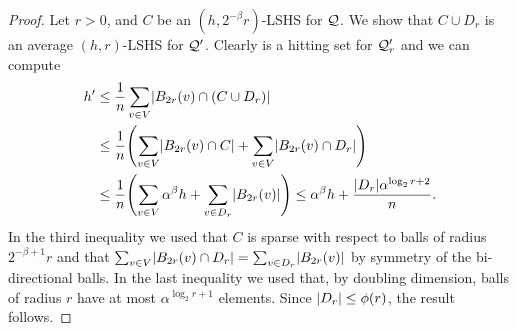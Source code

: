 \begin{proof}
Let $r>0$, and $C$ be an $(h,2^{-\beta}r)$-LSHS for $\mathcal{Q}$.
We show that $C\cup D_r$ is an average $(h,r)$-LSHS for $\mathcal{Q}'$.
Clearly is a hitting set for $\mathcal{Q}'_r$ and we can compute
\begin{align*}
h'&\leq \frac{1}{n}\sum_{v\in V} \abs{B_{2r}(v)\cap (C\cup D_r)}\\
&\leq \frac{1}{n}\prn*{\sum_{v\in V} \abs{B_{2r}(v)\cap C}+\sum_{v\in V} \abs{B_{2r}(v)\cap D_r}}\\
&\leq \frac{1}{n}\prn*{\sum_{v\in V} \alpha^\beta h+\sum_{v\in D_r} \abs{B_{2r}(v)}}
\leq \alpha^\beta h + \frac{\abs{D_r}\alpha^{\log_2r+2}}{n}.
\end{align*}
In the third inequality we used that $C$ is sparse with respect to balls of radius $2^{-\beta+1}r$ and that $\sum_{v\in V} \lvert B_{2r}(v)\cap D_r\rvert=\sum_{v\in D_r} \lvert B_{2r}(v)\rvert$ by symmetry of the bi-directional balls.
In the last inequality we used that, by doubling dimension, balls of radius $r$ have at most $\alpha^{\log_2r+1}$ elements.
Since $\lvert D_r\rvert\leq \phi(r)$, the result follows.
\end{proof}

